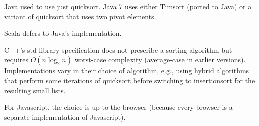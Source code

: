 Java used to use just quicksort.
Java 7 uses either Timsort (ported to Java) or a variant of quicksort that uses two pivot elements.

Scala defers to Java's implementation.

C++'s std library specification does not prescribe a sorting algorithm but requires $O(n\log_2 n)$ worst-case complexity (average-case in earlier versions).
Implementations vary in their choice of algorithm, e.g., using hybrid algorithms that perform some iterations of quicksort before switching to insertionsort for the resulting small lists.

For Javascript, the choice is up to the browser (because every browser is a separate implementation of Javascript).
